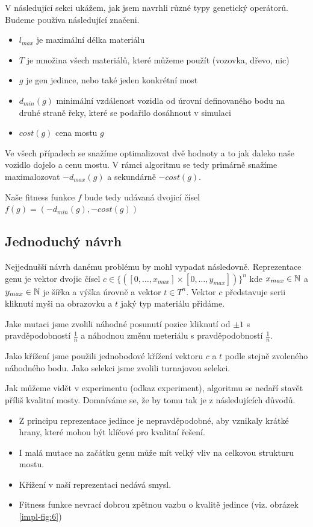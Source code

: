V následující sekci ukážem, jak jsem navrhli různé typy genetický operátorů. Budeme používa následující značeni.

\begin{itemize}
    \item $l_{max}$ je maximální délka materiálu
    \item $T$ je množina všech materiálů, které můžeme použít (vozovka, dřevo, nic)
    \item $g$ je gen jedince, nebo také jeden konkrétní most
    \item $d_{min}(g)$ minimální vzdálenost vozidla od úrovní definovaného bodu na druhé straně řeky, které se podařilo dosáhnout v simulaci
    \item $cost(g)$ cena mostu $g$
\end{itemize}

Ve všech případech se snažíme optimalizovat dvě hodnoty a to jak daleko naše vozidlo dojelo a cenu mostu. V rámci algoritmu se tedy primárně snažíme maximalozovat $-d_{max}(g)$ a sekundárně $-cost(g)$.

Naše fitness funkce $f$ bude tedy udávaná dvojicí čísel $f(g) = (-d_{min}(g), -cost(g))$

\subsection{Jednoduchý návrh}

Nejjednušší návrh danému problému by mohl vypadat následovně. Reprezentace genu je vektor dvojic čísel $c \in \{([0, \dots, x_{max}] \times [0, \dots, y_{max}])\}^n$ kde $x_{max} \in \mathbb{N}$ a $y_{max} \in \mathbb{N}$ je šířka a výška úrovně a vektor $t \in T^n$. Vektor $c$ představuje serii kliknutí myši na obrazovku a $t$ jaký typ materiálu přidáme.

Jake mutaci jsme zvolili náhodné posunutí pozice kliknutí od $\pm 1$ s pravděpodobností $\frac{1}{n}$ a náhodnou změnu meteriálu s pravděpodobností $\frac{1}{n}$.

Jako křížení jsme použili jednobodové křížení vektoru $c$  a $t$ podle stejně zvoleného náhodného bodu. Jako selekci jsme zvolili turnajovou selekci.

Jak můžeme vidět v experimentu (odkaz experiment), algoritmu se nedaří stavět příliš kvalitní mosty. Domníváme se, že by tomu tak je z následujících důvodů.

\begin{itemize}
    \item Z principu reprezentace jedince je nepravděpodobné, aby vznikaly krátké hrany, které mohou být klíčové pro kvalitní řešení.
    \item I malá mutace na začátku genu může mít velký vliv na celkovou strukturu mostu.
    \item Křížení v naší reprezentaci nedává smysl.
    \item Fitness funkce nevrací dobrou zpětnou vazbu o kvalitě jedince (viz. obrázek \ref{impl-fig:6})
\end{itemize}

